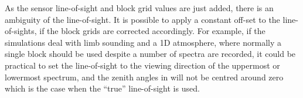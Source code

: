 As the sensor line-of-sight and block grid values are just added,
there is an ambiguity of the line-of-sight. It is possible to apply a
constant off-set to the line-of-sights, if the block grids are
corrected accordingly. For example, if the simulations deal with limb
sounding and a 1D atmosphere, where normally a single block should be
used despite a number of spectra are recorded, it could be practical
to set the line-of-sight to the viewing direction of the uppermost or
lowermost spectrum, and the zenith angles in 
will not be centred around zero which is the case when the ``true''
line-of-sight is used.






